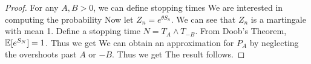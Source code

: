 \documentclass[a4paper,10pt,english]{article}
\begin{document}
\begin{proof}
For any $A,B > 0$, we can define stopping times
We are interested in computing the probability 
Now let $Z_n = e^{\theta S_n}$. We can see that $Z_n$ is a martingale with mean 1. 
Define a stopping time $N = T_A \wedge T_{-B}$. 
From Doob's Theorem, $\mathbb{E}[e^{S_N}] = 1$. 
Thus we get
We can obtain an approximation for $P_A$ by neglecting the overshoots past $A$ or $-B$. 
Thus we get
The result follows. 
\end{proof}

%
\end{document}
